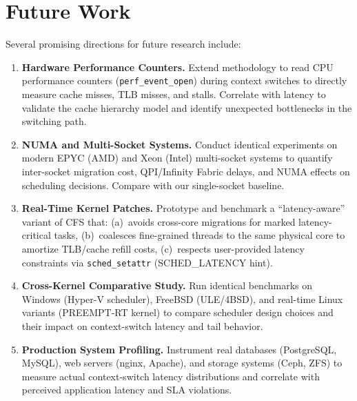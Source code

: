 \documentclass[conference]{IEEEtran}
\begin{document}
\section{Future Work}
\label{sec:future}

Several promising directions for future research include:

\begin{enumerate}
  \item \textbf{Hardware Performance Counters.}
        Extend methodology to read CPU performance counters (\texttt{perf\_event\_open})
        during context switches to directly measure cache misses, TLB misses, and stalls.
        Correlate with latency to validate the cache hierarchy model and identify
        unexpected bottlenecks in the switching path.

  \item \textbf{NUMA and Multi-Socket Systems.}
        Conduct identical experiments on modern EPYC (AMD) and Xeon (Intel) multi-socket
        systems to quantify inter-socket migration cost, QPI/Infinity Fabric delays,
        and NUMA effects on scheduling decisions.  Compare with our single-socket baseline.

  \item \textbf{Real-Time Kernel Patches.}
        Prototype and benchmark a ``latency-aware'' variant of CFS that:
        (a)~avoids cross-core migrations for marked latency-critical tasks,
        (b)~coalesces fine-grained threads to the same physical core to amortize
        TLB/cache refill costs, (c)~respects user-provided latency constraints
        via \texttt{sched\_setattr} (SCHED\_LATENCY hint).

  \item \textbf{Cross-Kernel Comparative Study.}
        Run identical benchmarks on Windows (Hyper-V scheduler), FreeBSD (ULE/4BSD),
        and real-time Linux variants (PREEMPT-RT kernel) to compare scheduler design
        choices and their impact on context-switch latency and tail behavior.

  \item \textbf{Production System Profiling.}
        Instrument real databases (PostgreSQL, MySQL), web servers (nginx, Apache),
        and storage systems (Ceph, ZFS) to measure actual context-switch latency
        distributions and correlate with perceived application latency and SLA violations.
\end{enumerate}
\end{document}
